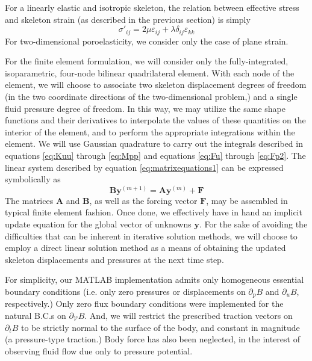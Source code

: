 \documentclass[11pt]{article} %
\begin{document}
For a linearly elastic and isotropic skeleton, the relation between effective stress and skeleton strain (as described in the previous section) is simply
\begin{equation}
	\sigma'_{ij} = 2 \mu \varepsilon_{ij} + \lambda \delta_{ij} \varepsilon_{kk}
\end{equation}
For two-dimensional poroelasticity, we consider only the case of plane strain.

For the finite element formulation, we will consider only the fully-integrated, isoparametric, four-node bilinear quadrilateral element. With each node of the element, we will choose to associate two skeleton displacement degrees of freedom (in the two coordinate directions of the two-dimensional problem,) and a single fluid pressure degree of freedom. In this way, we may utilize the same shape functions and their derivatives to interpolate the values of these quantities on the interior of the element, and to perform the appropriate integrations within the element. We will use Gaussian quadrature to carry out the integrals described in equations \ref{eq:Kuu} through \ref{eq:Mpp} and equations \ref{eq:Fu} through \ref{eq:Fp2}. The linear system described by equation \ref{eq:matrixequations1} can be expressed symbolically as
\begin{equation}
	\mathbf{B} \mathbf{y}^{(m+1)} = \mathbf{A} \mathbf{y}^{(m)} + \mathbf{F}
\end{equation}
The matrices $\mathbf{A}$ and $\mathbf{B}$, as well as the forcing vector $\mathbf{F}$, may be assembled in typical finite element fashion. Once done, we effectively have in hand an implicit update equation for the global vector of unknowns $\mathbf{y}$. For the sake of avoiding the difficulties that can be inherent in iterative solution methods, we will choose to employ a direct linear solution method as a means of obtaining the updated skeleton displacements and pressures at the next time step.

For simplicity, our MATLAB implementation admits only homogeneous essential boundary conditions (i.e. only zero pressures or displacements on $\partial_p B$ and $\partial_u B$, respectively.) Only zero flux boundary conditions were implemented for the natural B.C.s on $\partial_{\mathcal{V}} B$. And, we will restrict the prescribed traction vectors on $\partial_t B$ to be strictly normal to the surface of the body, and constant in magnitude (a pressure-type traction.) Body force has also been neglected, in the interest of observing fluid flow due only to pressure potential.
\end{document}
